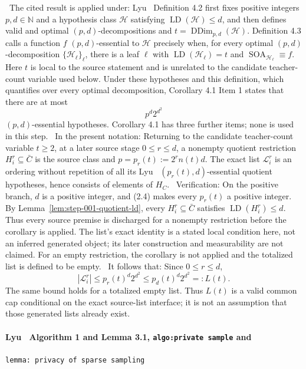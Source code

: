 \noindent\textbullet\ The cited result is applied under: Lyu~\citep{lyu2025} Definition 4.2 first fixes
  positive integers \(p,d\in\mathbb N\) and a hypothesis class
  \(\mathcal H\) satisfying
  \(\operatorname{LD}(\mathcal H)\le d\), and then defines valid and optimal
  \((p,d)\)-decompositions and
  \(t=\operatorname{DDim}_{p,d}(\mathcal H)\). Definition 4.3 calls a
  function \(f\) \((p,d)\)-essential to \(\mathcal H\) precisely when, for
  every optimal \((p,d)\)-decomposition
  \(\{\mathcal H_\ell\}_{\ell}\), there is a leaf \(\ell\) with
  \(\operatorname{LD}(\mathcal H_\ell)=t\) and
  \(\operatorname{SOA}_{\mathcal H_\ell}\equiv f\). Here \(t\) is local to
  the source statement and is unrelated to the candidate teacher-count
  variable used below. Under these hypotheses and this definition, which
  quantifies over every optimal decomposition, Corollary 4.1 Item 1 states
  that there are at most
  \[
  p^d2^{d^2}
  \]
  \((p,d)\)-essential hypotheses. Corollary 4.1 has three further items;
  none is used in this step.
\noindent\textbullet\ In the present notation: Returning to the candidate teacher-count variable
  \(t\ge2\), at a later source stage \(0\le r\le d\), a nonempty quotient
  restriction \(H_i^r\subseteq\bar C\) is the source class and
  \(p=p_r(t):=2^rn(t)d\). The exact list \(\mathcal L_i^r\) is an ordering
  without repetition of all its Lyu~\citep{lyu2025} \((p_r(t),d)\)-essential quotient
  hypotheses, hence consists of elements of \(H_C\).
\noindent\textbullet\ Verification: On the positive branch, \(d\) is a positive integer,
  and (2.4) makes every \(p_r(t)\) a positive integer. By
  Lemma~\ref{lem:step-001-quotient-ld}, every
  \(H_i^r\subseteq\bar C\) satisfies
  \(\operatorname{LD}(H_i^r)\le d\). Thus every source premise is discharged
  for a nonempty restriction before the corollary is applied. The list's
  exact identity is a stated local condition here, not an inferred generated
  object; its later construction and measurability are not claimed. For an
  empty restriction, the corollary is not applied and the totalized list is
  defined to be empty.
\noindent\textbullet\ It follows that: Since \(0\le r\le d\),
  \[
  |\mathcal L_i^r|
  \le p_r(t)^d2^{d^2}
  \le p_d(t)^d2^{d^2}=:L(t).
  \]
  The same bound holds for a totalized empty list. Thus \(L(t)\) is a valid
  common cap conditional on the exact source-list interface; it is not an
  assumption that those generated lists already exist.

\paragraph{Lyu~\citep{lyu2025} Algorithm 1 and Lemma 3.1, \texttt{algo:private sample} and}
\texttt{lemma: privacy of sparse sampling}

